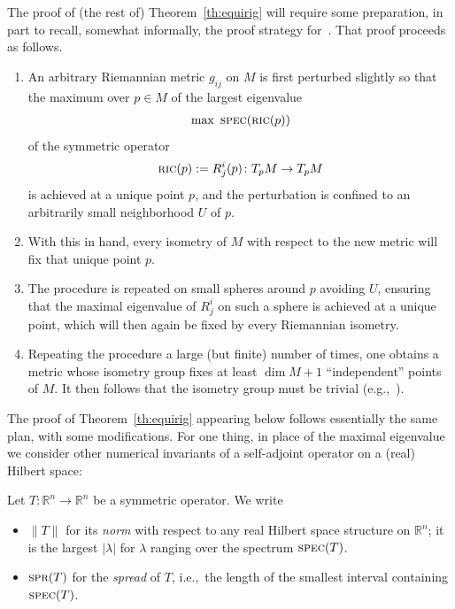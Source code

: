 \documentclass[pdftex]{sigma}%
\numberwithin{equation}{section}
\newcommand{\cat}[1]{\textsc{#1}}
\begin{document}
The proof of (the rest of) Theorem~\ref{th:equirig} will require some preparation, in part to recall, somewhat informally, the proof strategy for~\cite[Proposition~8.3]{eb}. That proof proceeds as follows.

\begin{enumerate}[$(a)$]\itemsep=0pt
\item%
An arbitrary Riemannian metric $g_{ij}$ on $M$ is first perturbed slightly so that the maximum over $p\in M$ of the largest eigenvalue
 \begin{gather*}
 \max~\cat{spec}(\cat{ric}(p))
 \end{gather*}
 of the symmetric operator
 \begin{gather*}
 \cat{ric}(p):=R^i_j(p)\colon T_pM\to T_pM
 \end{gather*}
 is achieved at a unique point $p$, and the perturbation is confined to an arbitrarily small neighborhood $U$ of $p$.
\item%
With this in hand, every isometry of $M$ with respect to the new metric will fix that unique point $p$.
\item%
The procedure is repeated on small spheres around $p$ avoiding $U$, ensuring that the maximal eigenvalue of $R^i_j$ on such a sphere is achieved at a unique point, which will then again be fixed by every Riemannian isometry.
\item%
Repeating the procedure a large (but finite) number of times, one obtains a metric whose isometry group fixes at least $\dim M+1$ ``independent'' points of $M$. It then follows that the isometry group must be trivial (e.g.,~\cite[Theorem~3]{ms}).
\end{enumerate}

The proof of Theorem~\ref{th:equirig} appearing below follows essentially the same plan, with some modifications. For one thing, in place of the maximal eigenvalue we consider other numerical invariants of a self-adjoint operator on a (real) Hilbert space:

\begin{Notation}%
 Let $T\colon \mathbb{R}^n\to \mathbb{R}^n$ be a symmetric operator. We write
 \begin{itemize}\itemsep=0pt
 \item $\|T\|$ for its {\it norm} with respect to any real Hilbert space structure on $\mathbb{R}^n$; it is the largest $|\lambda|$ for $\lambda$ ranging over the spectrum $\cat{spec}(T)$.
 \item $\cat{spr}(T)$ for the {\it spread} of $T$, i.e.,~the length of the smallest interval containing $\cat{spec}(T)$.
 \end{itemize}
\end{Notation}
\end{document}
